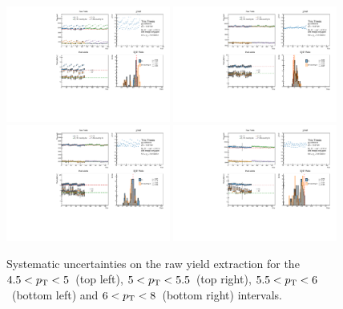 \begin{figure}
    \centering
    \includegraphics[width=0.48\textwidth]{Figures/Chapter 5/AllPtBins/RawYieldSyst4.5_5.pdf}
    \includegraphics[width=0.48\textwidth]{Figures/Chapter 5/AllPtBins/RawYieldSyst5_5.5.pdf}
    \includegraphics[width=0.48\textwidth]{Figures/Chapter 5/AllPtBins/RawYieldSyst5.5_6.pdf}
    \includegraphics[width=0.48\textwidth]{Figures/Chapter 5/AllPtBins/RawYieldSyst6_8.pdf}
    \caption{Systematic uncertainties on the raw yield extraction for the $4.5 < p_\mathrm{T} < 5$~\gevc (top left), $5 < p_\mathrm{T} < 5.5$~\gevc (top right), $5.5 < p_\mathrm{T} < 6$~\gevc (bottom left) and $6 < p_\mathrm{T} < 8$~\gevc (bottom right) intervals.}
\end{figure}

